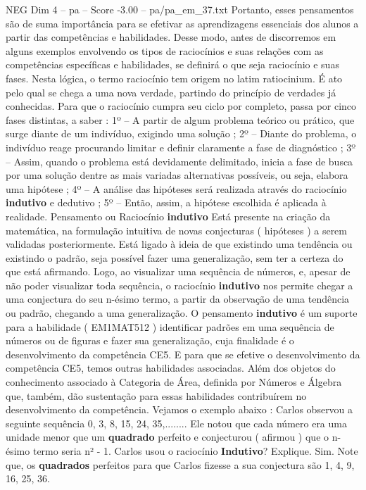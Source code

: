 \begin{textsample}{NEG Dim 4 – pa – Score -3.00 – pa/pa\_em\_37.txt}
Portanto, esses pensamentos são de suma importância para se efetivar as aprendizagens essenciais dos alunos a partir das competências e habilidades.
Desse modo, antes de discorremos em alguns exemplos envolvendo os tipos de raciocínios e suas relações com as competências específicas e habilidades, se definirá o que seja raciocínio e suas fases.
Nesta lógica, o termo raciocínio tem origem no latim ratiocinium.
É ato pelo qual se chega a uma nova verdade, partindo do princípio de verdades já conhecidas.
Para que o raciocínio cumpra seu ciclo por completo, passa por cinco fases distintas, a saber : 1º – A partir de algum problema teórico ou prático, que surge diante de um indivíduo, exigindo uma solução ; 2º – Diante do problema, o indivíduo reage procurando limitar e definir claramente a fase de diagnóstico ; 3º – Assim, quando o problema está devidamente delimitado, inicia a fase de busca por uma solução dentre as mais variadas alternativas possíveis, ou seja, elabora uma hipótese ; 4º – A análise das hipóteses será realizada através do raciocínio \textbf{indutivo} e dedutivo ; 5º – Então, assim, a hipótese escolhida é aplicada à realidade.
Pensamento ou Raciocínio \textbf{indutivo} Está presente na criação da matemática, na formulação intuitiva de novas conjecturas ( hipóteses ) a serem validadas posteriormente.
Está ligado à ideia de que existindo uma tendência ou existindo o padrão, seja possível fazer uma generalização, sem ter a certeza do que está afirmando.
Logo, ao visualizar uma sequência de números, e, apesar de não poder visualizar toda sequência, o raciocínio \textbf{indutivo} nos permite chegar a uma conjectura do seu n-ésimo termo, a partir da observação de uma tendência ou padrão, chegando a uma generalização.
O pensamento \textbf{indutivo} é um suporte para a habilidade ( EM1MAT512 ) identificar padrões em uma sequência de números ou de figuras e fazer sua generalização, cuja finalidade é o desenvolvimento da competência CE5.
E para que se efetive o desenvolvimento da competência CE5, temos outras habilidades associadas.
Além dos objetos do conhecimento associado à Categoria de Área, definida por Números e Álgebra que, também, dão sustentação para essas habilidades contribuírem no desenvolvimento da competência.
Vejamos o exemplo abaixo : Carlos observou a seguinte sequência 0, 3, 8, 15, 24, 35,........
Ele notou que cada número era uma unidade menor que um \textbf{quadrado} perfeito e conjecturou ( afirmou ) que o n-ésimo termo seria n² - 1.
Carlos usou o raciocínio \textbf{Indutivo}?
Explique.
Sim.
Note que, os \textbf{quadrados} perfeitos para que Carlos fizesse a sua conjectura são 1, 4, 9, 16, 25, 36.

\end{textsample}
